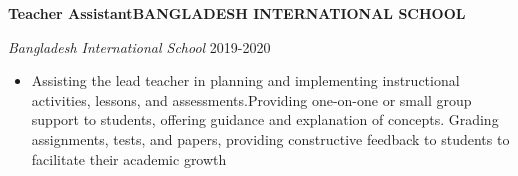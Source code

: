 \textbf{Teacher Assistant\hfill BANGLADESH INTERNATIONAL SCHOOL}\par

\textit{Bangladesh International School } \hfill 2019-2020
\begin{itemize}
	\item Assisting the lead teacher in planning and implementing instructional activities, lessons, and assessments.Providing one-on-one or small group support to students, offering guidance and explanation of concepts.
Grading assignments, tests, and papers, providing constructive feedback to students to facilitate their
academic growth
\end{itemize}\par